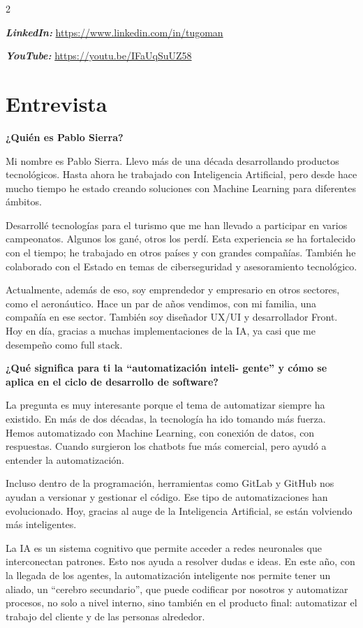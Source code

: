 \documentclass[12pt,spanish,Letterpaper,openany]{book}
\begin{document}
\begin {multicols}{2}

\textbf{\emph{LinkedIn:}} \url{https://www.linkedin.com/in/tugoman}

\textbf{\emph{YouTube:}} \url{https://youtu.be/IFaUqSuUZ58}

\hypertarget{entrevista-2}{%
\section{Entrevista}\label{entrevista-2}}

\textbf{¿Quién es Pablo Sierra?}

Mi nombre es Pablo Sierra. Llevo más de una década desarrollando productos tecnológicos. Hasta ahora he trabajado con Inteligencia Artificial, pero desde hace mucho tiempo he estado creando soluciones con Machine Learning para diferentes ámbitos.

Desarrollé tecnologías para el turismo que me han llevado a participar en varios campeonatos. Algunos los gané, otros los perdí. Esta experiencia se ha fortalecido con el tiempo; he trabajado en otros países y con grandes compañías. También he colaborado con el Estado en temas de ciberseguridad y asesoramiento tecnológico.

Actualmente, además de eso, soy emprendedor y empresario en otros sectores, como el aeronáutico. Hace un par de años vendimos, con mi familia, una compañía en ese sector. También soy diseñador UX/UI y desarrollador Front. Hoy en día, gracias a muchas implementaciones de la IA, ya casi que me desempeño como full stack.

\textbf{¿Qué significa para ti la ``automatización inteli-
gente'' y cómo se aplica en el ciclo de desarrollo de software?}

La pregunta es muy interesante porque el tema de automatizar siempre ha existido. En más de dos décadas, la tecnología ha ido tomando más fuerza. Hemos automatizado con Machine Learning, con conexión de datos, con respuestas. Cuando surgieron los chatbots fue más comercial, pero ayudó a entender la automatización.

Incluso dentro de la programación, herramientas como GitLab y GitHub nos ayudan a versionar y gestionar el código. Ese tipo de automatizaciones han evolucionado. Hoy, gracias al auge de la Inteligencia Artificial, se están volviendo más inteligentes.

La IA es un sistema cognitivo que permite acceder a redes neuronales que interconectan patrones. Esto nos ayuda a resolver dudas e ideas. En este año, con la llegada de los agentes, la automatización inteligente nos permite tener un aliado, un ``cerebro secundario'', que puede codificar por nosotros y automatizar procesos, no solo a nivel interno, sino también en el producto final: automatizar el trabajo del cliente y de las personas alrededor.


\end{multicols}
\end{document}
